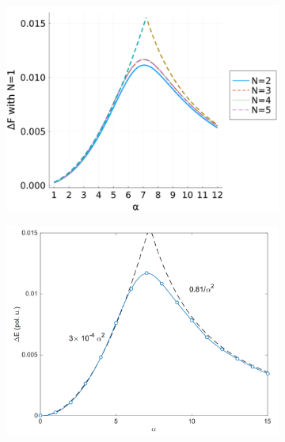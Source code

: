 \begin{figure}[!tbp]
    \centering
  \begin{subfigure}[b]{0.49\textwidth}
    \centering
    \includegraphics[width=\textwidth]{figures/E_all.png}
  \end{subfigure}
  \hfill
  \begin{subfigure}[b]{0.49\textwidth}
    \centering
    \includegraphics[width=\textwidth]{figures/dries.png}
  \end{subfigure}
  \begin{subfigure}[b]{0.49\textwidth}
    \centering

\end{subfigure}
\end{figure}
